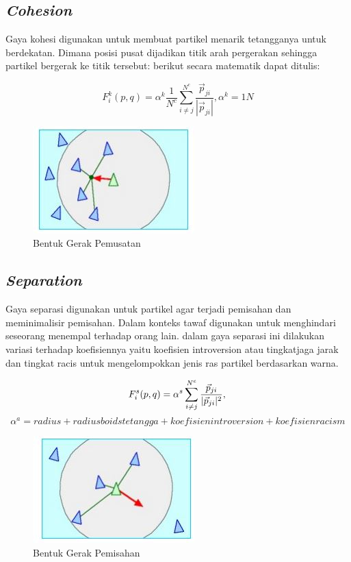 \subsection{\emph{Cohesion}}\label{sec:cohesion}
\hspace{0.5cm}Gaya kohesi digunakan untuk membuat partikel menarik tetangganya untuk berdekatan. Dimana posisi pusat dijadikan titik arah pergerakan sehingga partikel bergerak ke titik tersebut: berikut secara matematik dapat ditulis:

\begin{equation}
 F_i^k(p,q) = \alpha^k \dfrac{1}{N^c}\sum^{N^c}_{i \neq j}\dfrac{\vec{p}_{ji}}{|\vec{p}_{ji}|} , \alpha^k = 1N
\end{equation}
\begin{figure}
\centering
\includegraphics[scale=0.5]{gambar/cohesion}
\caption{Bentuk Gerak Pemusatan}
\end{figure}

\subsection{\emph{Separation}}\label{sec:separation}
\hspace{0.5cm} Gaya separasi digunakan untuk partikel agar terjadi pemisahan dan meminimalisir pemisahan. Dalam konteks tawaf digunakan untuk menghindari seseorang menempal terhadap orang lain. dalam gaya separasi ini dilakukan variasi terhadap koefisiennya yaitu koefisien introversion atau tingkatjaga jarak dan tingkat racis untuk mengelompokkan jenis ras partikel berdasarkan warna.

\begin{equation}
 F_i^s(p,q) = \alpha^s \sum^{N^c}_{i \neq j}\dfrac{\vec{p}_{ji}}{|\vec{p}_{ji}|^2},\\
 \end{equation}
\begin{equation}
\alpha^a = radius + radius boids tetangga + koefisien introversion + koefisien racism
 \end{equation}

\begin{figure}
\centering
\includegraphics[scale=0.5]{gambar/separation}
\caption{Bentuk Gerak Pemisahan}
\end{figure}


